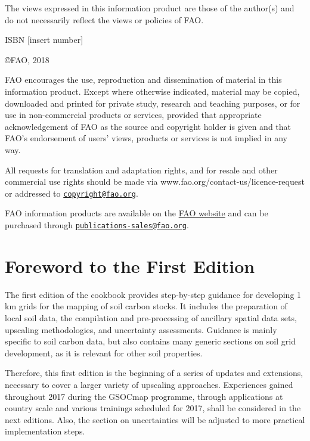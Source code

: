 \documentclass[10pt,b5paper,]{book}
\theoremstyle{definition}
\theoremstyle{definition}
\theoremstyle{definition}
\theoremstyle{remark}
\begin{document}
The views expressed in this information product are those of the
author(s) and do not necessarily reflect the views or policies of FAO.

ISBN {[}insert number{]}

\copyright FAO, 2018

FAO encourages the use, reproduction and dissemination of material in
this information product. Except where otherwise indicated, material may
be copied, downloaded and printed for private study, research and
teaching purposes, or for use in non-commercial products or services,
provided that appropriate acknowledgement of FAO as the source and
copyright holder is given and that FAO's endorsement of users' views,
products or services is not implied in any way.

All requests for translation and adaptation rights, and for resale and
other commercial use rights should be made via
www.fao.org/contact-us/licence-request or addressed to
\href{mailto:copyright@fao.org}{\nolinkurl{copyright@fao.org}}.

FAO information products are available on the
\href{www.fao.org/publications}{FAO website} and can be purchased
through
\href{mailto:publications-sales@fao.org}{\nolinkurl{publications-sales@fao.org}}.

\hypertarget{foreword-to-the-first-edition}{%
\chapter*{Foreword to the First
Edition}\label{foreword-to-the-first-edition}}

The first edition of the cookbook provides step-by-step guidance for
developing 1 km grids for the mapping of soil carbon stocks. It includes
the preparation of local soil data, the compilation and pre-processing
of ancillary spatial data sets, upscaling methodologies, and uncertainty
assessments. Guidance is mainly specific to soil carbon data, but also
contains many generic sections on soil grid development, as it is
relevant for other soil properties.

Therefore, this first edition is the beginning of a series of updates
and extensions, necessary to cover a larger variety of upscaling
approaches. Experiences gained throughout 2017 during the GSOCmap
programme, through applications at country scale and various trainings
scheduled for 2017, shall be considered in the next editions. Also, the
section on uncertainties will be adjusted to more practical
implementation steps.
\end{document}
